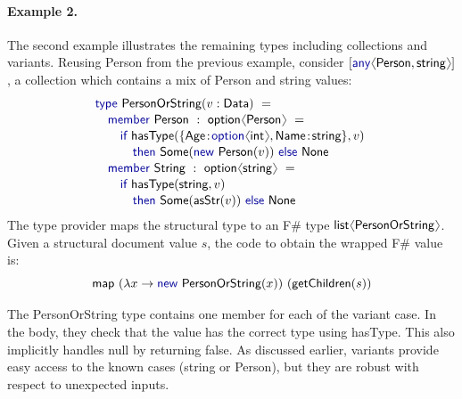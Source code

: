\documentclass[10pt,preprint,blind,clearpagebib]{sigplanconf}
\newcommand{\langl}{\begin{picture}(4.5,7)
\put(1.1,2.5){\rotatebox{60}{\line(1,0){5.5}}}
\put(1.1,2.5){\rotatebox{300}{\line(1,0){5.5}}}
\end{picture}}
\newcommand{\rangl}{\begin{picture}(4.5,7)
\put(.9,2.5){\rotatebox{120}{\line(1,0){5.5}}}
\put(.9,2.5){\rotatebox{240}{\line(1,0){5.5}}}
\end{picture}}
\newcommand{\kvd}[1]{\textnormal{\textcolor{kvdclr}{\sffamily #1}}}
\newcommand{\ident}[1]{\textnormal{\sffamily #1}}
\begin{document}
\paragraph{Example 2.} The second example illustrates the remaining types including collections and 
variants. Reusing \ident{Person} from the previous example, consider 
$[\kvd{any}\langl\ident{Person},\ident{string}\rangl]$, a collection which contains a mix 
of \ident{Person} and string values:
%
\begin{equation*}
\begin{array}{l}
 \kvd{type}~\ident{PersonOrString}(v:\ident{Data})~= \\[0.1em]
 \quad \kvd{member}~\ident{Person}~:~\ident{option}\langl\ident{Person}\rangl~= \\[0.1em]
 \qquad \kvd{if}~\ident{hasType}(\{\ident{Age}\!:\!\kvd{option}\langl\ident{int}\rangl, \ident{Name}\!:\!\ident{string}\}, v)~\\[0.1em]
 \qquad\quad \kvd{then}~\ident{Some}(\kvd{new}~\ident{Person}(v))~\kvd{else}~\ident{None} \\[0.1em]
 \quad \kvd{member}~\ident{String}~:~\ident{option}\langl\ident{string}\rangl~= \\[0.1em]
 \qquad \kvd{if}~\ident{hasType}(\ident{string}, v)~\\[0.1em]
 \qquad\quad \kvd{then}~\ident{Some}(\ident{asStr}(v))~\kvd{else}~\ident{None}
\end{array}
\end{equation*}
%
The type provider maps the structural type to an F\# type $\ident{list}\langl\ident{PersonOrString}\rangl$. 
Given a structural document value $s$, the code to obtain the wrapped F\# value is:
%
\begin{equation*}
\ident{map}~(\lambda x\rightarrow\kvd{new}~\ident{PersonOrString}(x))~(\ident{getChildren}(s))
\end{equation*}

The \ident{PersonOrString} type contains one member for each of the variant case. In the body, they
check that the value has the correct type using \ident{hasType}. This also implicitly handles \kvd{null}
by returning \kvd{false}. As discussed earlier, variants provide easy access to the known cases
(\ident{string} or \ident{Person}), but they are robust with respect to unexpected inputs.



%
%
\end{document}
